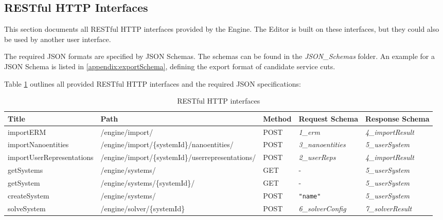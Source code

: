\subsection{RESTful HTTP Interfaces}

This section documents all RESTful HTTP interfaces provided by the Engine. The Editor is built on these interfaces, but they could also be used by another user interface.

The required \gls{JSON} formats are specified by \gls{JSON} Schemas\cite{jsonSchema}. The schemas can be found in the \textit{JSON\_Schemas} folder. An example for a \gls{JSON} Schema is listed in \ref{appendix:exportSchema}, defining the export format of candidate service cuts. 

Table \ref{tab:restApis} outlines all provided RESTful HTTP interfaces and the required \gls{JSON} specifications:

\begin{table}[H]
	\centering
	\caption{RESTful HTTP interfaces}
	\label{tab:restApis}
	\begin{tabular}{|p{90pt}|p{140pt}|p{40pt}|p{80pt}|p{80pt}|}
		\hline	
		\textbf{Title} & \textbf{Path} & \textbf{Method} & \textbf{Request Schema} &\textbf{Response Schema} \\
		\hline
		importERM & /engine/import/ & POST & \textit{1\_erm} & \textit{4\_importResult} \\
		\hline
		importNanoentities & /engine/import/\{systemId\}/\newline nanoentities/ & POST & \textit{3\_nanoentities} & \textit{5\_userSystem} \\
		\hline 
		importUser\newline Representations & /engine/import/\{systemId\}/\newline userrepresentations/ & POST &  \textit{2\_userReps} &  \textit{4\_importResult} \\
		\hline 
		getSystems & /engine/systems/ & GET & - &  \textit{5\_userSystem} \\
		\hline 
		getSystem & /engine/systems/\{systemId\}/ & GET & - & \textit{5\_userSystem} \\
		\hline 
		createSystem & /engine/systems/ & POST & \texttt{"name"} &  \textit{5\_userSystem} \\
		\hline
		solveSystem & /engine/solver/\{systemId\} & POST & \textit{6\_solverConfig} & \textit{7\_solverResult} \\
		\hline
	\end{tabular}
\end{table}

